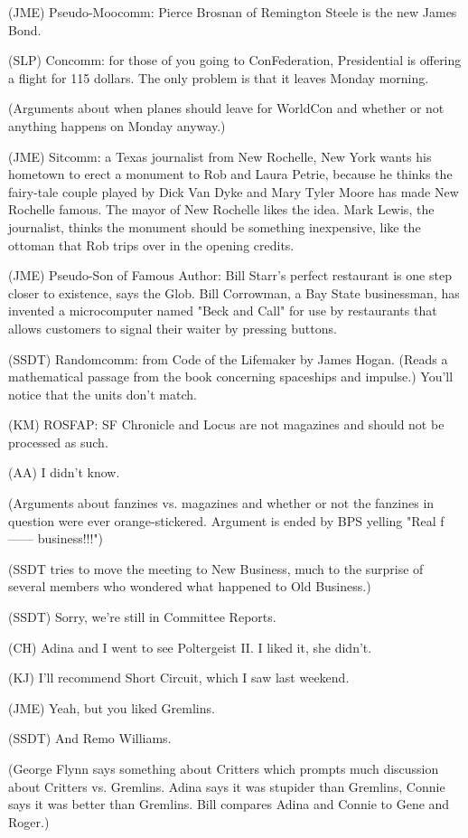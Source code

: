 \documentclass[12pt]{article}
\begin{document}
(JME) Pseudo-Moocomm: Pierce Brosnan of Remington Steele is the new James Bond.

(SLP) Concomm: for those of you going to ConFederation, Presidential is offering a flight for 115 dollars. The only problem is that it leaves Monday morning.

(Arguments about when planes should leave for WorldCon and whether or not anything happens on Monday anyway.)

(JME) Sitcomm: a Texas journalist from New Rochelle, New York wants his hometown to erect a monument to Rob and Laura Petrie, because he thinks the fairy-tale couple played by Dick Van Dyke and Mary Tyler Moore has made New Rochelle famous. The mayor of New Rochelle likes the idea. Mark Lewis, the journalist, thinks the monument should be something inexpensive, like the ottoman that Rob trips over in the opening credits.

(JME) Pseudo-Son of Famous Author: Bill Starr's perfect restaurant is one step closer to existence, says the Glob. Bill Corrowman, a Bay State businessman, has invented a microcomputer named "Beck and Call" for use by restaurants that allows customers to signal their waiter by pressing buttons.

(SSDT) Randomcomm: from Code of the Lifemaker by James Hogan. (Reads a mathematical passage from the book concerning spaceships and impulse.) You'll notice that the units don't match.

(KM) ROSFAP: SF Chronicle and Locus are not magazines and should not be processed as such.

(AA) I didn't know.

(Arguments about fanzines vs. magazines and whether or not the fanzines in question were ever orange-stickered. Argument is ended by BPS yelling "Real f------ business!!!")

(SSDT tries to move the meeting to New Business, much to the surprise of several members who wondered what happened to Old Business.)

(SSDT) Sorry, we're still in Committee Reports.

(CH) Adina and I went to see Poltergeist II. I liked it, she didn't.

(KJ) I'll recommend Short Circuit, which I saw last weekend.

(JME) Yeah, but you liked Gremlins.

(SSDT) And Remo Williams.

(George Flynn says something about Critters which prompts much discussion about Critters vs. Gremlins. Adina says it was stupider than Gremlins, Connie says it was better than Gremlins. Bill compares Adina and Connie to Gene and Roger.)
\end{document}

